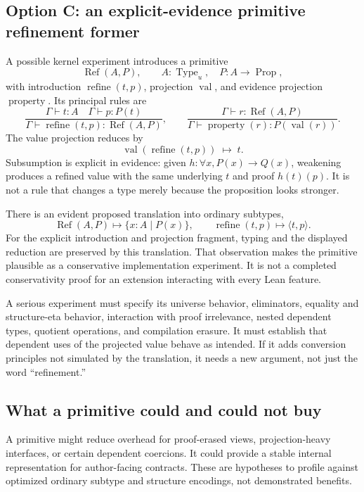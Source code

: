\documentclass[11pt,a4paper]{article}
\theoremstyle{definition}
\theoremstyle{remark}
\begin{document}
\subsection{Option C: an explicit-evidence primitive refinement former}
A possible kernel experiment introduces a primitive
\[
 \operatorname{Ref}(A,P),\qquad A:\operatorname{Type}_u,\quad P:A\to\operatorname{Prop},
\]
with introduction $\operatorname{refine}(t,p)$, projection $\operatorname{val}$, and evidence projection $\operatorname{property}$. Its principal rules are
\[
 \frac{\Gamma\vdash t:A\quad\Gamma\vdash p:P(t)}
      {\Gamma\vdash\operatorname{refine}(t,p):\operatorname{Ref}(A,P)},
 \qquad
 \frac{\Gamma\vdash r:\operatorname{Ref}(A,P)}
      {\Gamma\vdash \operatorname{property}(r):P(\operatorname{val}(r))}.
\]
The value projection reduces by
\[
 \operatorname{val}(\operatorname{refine}(t,p))\;\longmapsto\;t.
\]
Subsumption is explicit in evidence: given $h:\forall x, P(x)\to Q(x)$, weakening produces a refined value with the same underlying $t$ and proof $h(t)(p)$. It is not a rule that changes a type merely because the proposition looks stronger.

There is an evident proposed translation into ordinary subtypes,
\[
 \operatorname{Ref}(A,P)\mapsto\{x:A\mid P(x)\},\qquad
 \operatorname{refine}(t,p)\mapsto\langle t,p\rangle.
\]
For the explicit introduction and projection fragment, typing and the displayed reduction are preserved by this translation. That observation makes the primitive plausible as a conservative implementation experiment. It is not a completed conservativity proof for an extension interacting with every Lean feature.

A serious experiment must specify its universe behavior, eliminators, equality and structure-eta behavior, interaction with proof irrelevance, nested dependent types, quotient operations, and compilation erasure. It must establish that dependent uses of the projected value behave as intended. If it adds conversion principles not simulated by the translation, it needs a new argument, not just the word ``refinement.''

\subsection{What a primitive could and could not buy}
A primitive might reduce overhead for proof-erased views, projection-heavy interfaces, or certain dependent coercions. It could provide a stable internal representation for author-facing contracts. These are hypotheses to profile against optimized ordinary subtype and structure encodings, not demonstrated benefits.
\end{document}
